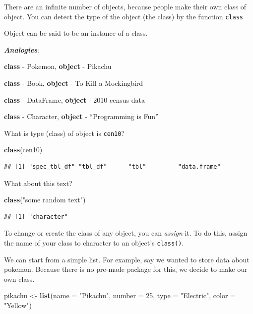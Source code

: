 \documentclass[]{book}
\newenvironment{Shaded}{\begin{snugshade}}{\end{snugshade}}
\newcommand{\KeywordTok}[1]{\textcolor[rgb]{0.13,0.29,0.53}{\textbf{#1}}}
\newcommand{\DataTypeTok}[1]{\textcolor[rgb]{0.13,0.29,0.53}{#1}}
\newcommand{\DecValTok}[1]{\textcolor[rgb]{0.00,0.00,0.81}{#1}}
\newcommand{\StringTok}[1]{\textcolor[rgb]{0.31,0.60,0.02}{#1}}
\newcommand{\NormalTok}[1]{#1}
\theoremstyle{definition}
\theoremstyle{definition}
\theoremstyle{definition}
\theoremstyle{remark}
\begin{document}
There are an infinite number of objects, because people make their own
class of object. You can detect the type of the object (the class) by
the function \texttt{class}

Object can be said to be an instance of a class.

\textbf{\emph{Analogies}}:

\textbf{class} - Pokemon, \textbf{object} - Pikachu

\textbf{class} - Book, \textbf{object} - To Kill a Mockingbird

\textbf{class} - DataFrame, \textbf{object} - 2010 census data

\textbf{class} - Character, \textbf{object} - ``Programming is Fun''

What is type (class) of object is \texttt{cen10}?

\begin{Shaded}
\begin{Highlighting}[]
\KeywordTok{class}\NormalTok{(cen10)}
\end{Highlighting}
\end{Shaded}

\begin{verbatim}
## [1] "spec_tbl_df" "tbl_df"      "tbl"         "data.frame"
\end{verbatim}

What about this text?

\begin{Shaded}
\begin{Highlighting}[]
\KeywordTok{class}\NormalTok{(}\StringTok{"some random text"}\NormalTok{)}
\end{Highlighting}
\end{Shaded}

\begin{verbatim}
## [1] "character"
\end{verbatim}

To change or create the class of any object, you can \emph{assign} it.
To do this, assign the name of your class to character to an object's
\texttt{class()}.

We can start from a simple list. For example, say we wanted to store
data about pokemon. Because there is no pre-made package for this, we
decide to make our own class.

\begin{Shaded}
\begin{Highlighting}[]
\NormalTok{pikachu <-}\StringTok{ }\KeywordTok{list}\NormalTok{(}\DataTypeTok{name =} \StringTok{"Pikachu"}\NormalTok{,}
                \DataTypeTok{number =} \DecValTok{25}\NormalTok{,}
                \DataTypeTok{type =} \StringTok{"Electric"}\NormalTok{,}
                \DataTypeTok{color =} \StringTok{"Yellow"}\NormalTok{)}
\end{Highlighting}
\end{Shaded}
\end{document}

